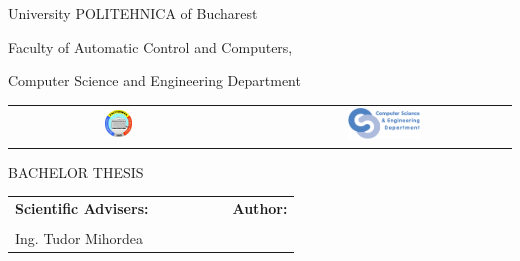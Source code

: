 \begin{titlepage}
	\begin{center}
		{\Large University POLITEHNICA of Bucharest}
		\par\vspace*{2mm}
		{\Large Faculty of Automatic Control and Computers,
		
		Computer Science and Engineering Department}
		\par\vspace*{3mm}
		\begin{table}[h]
        	\begin{center}
				\begin{tabular}{cccc}
                    \includegraphics[width=0.13\textwidth]{src/img/branding/upb}
					& & &
					\includegraphics[width=0.30\textwidth]{src/img/branding/cs}
            	\end{tabular}
			\end{center}
		\end{table}
		
		\par\vspace*{35mm}
		{\Huge BACHELOR THESIS}
		\par\vspace*{15mm}
		{\Huge \VARtitleen}
		\par\vspace*{35mm}
		\begin{table}[h]
        	\begin{center}
				\begin{tabular}{lcccccl}
					\Large \textbf{\Large Scientific Advisers:}
					\vspace*{1mm} &&&&&& \Large \textbf{\Large Author:}\vspace*{1mm} \\
					\Large \VARadviser &&&&&& \Large \VARauthor \\
                                        \vspace*{1mm}
                                        \Large Ing. Tudor Mihordea
				\end{tabular}
			\end{center}
		\end{table}

		\par\vspace*{40mm}
		\Large \VARtitlefooteren
	\end{center}
\end{titlepage}

